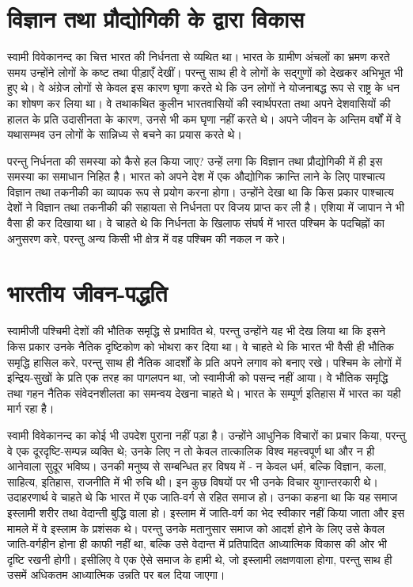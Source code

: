\section*{विज्ञान तथा प्रौद्योगिकी के द्वारा विकास}

स्वामी विवेकानन्द का चित्त भारत की निर्धनता से व्यथित था। भारत के ग्रामीण अंचलों का भ्रमण करते समय उन्होंने लोगों के कष्ट तथा पीड़ाएँ देखीं। परन्तु साथ ही वे लोगों के सद्गुणों को देखकर अभिभूत भी हुए थे। वे अंग्रेज लोगों से केवल इस कारण घृणा करते थे कि उन लोगों ने योजनाबद्ध रूप से राष्ट्र के धन का शोषण कर लिया था। वे तथाकथित कुलीन भारतवासियों की स्वार्थपरता तथा अपने देशवासियों की हालत के प्रति उदासीनता के कारण, उनसे भी कम घृणा नहीं करते थे। अपने जीवन के अन्तिम वर्षों में वे यथासम्भव उन लोगों के सान्निध्य से बचने का प्रयास करते थे। 

परन्तु निर्धनता की समस्या को कैसे हल किया जाए? उन्हें लगा कि विज्ञान तथा प्रौद्योगिकी में ही इस समस्या का समाधान निहित है। भारत को अपने देश में एक औद्योगिक क्रान्ति लाने के लिए पाश्चात्य विज्ञान तथा तकनीकी का व्यापक रूप से प्रयोग करना होगा। उन्होंने देखा था कि किस प्रकार पाश्चात्य देशों ने विज्ञान तथा तकनीकी की सहायता से निर्धनता पर विजय प्राप्त कर ली है। एशिया में जापान ने भी वैसा ही कर दिखाया था। वे चाहते थे कि निर्धनता के खिलाफ संघर्ष में भारत पश्चिम के पदचिह्नों का अनुसरण करे, परन्तु अन्य किसी भी क्षेत्र में वह पश्चिम की नकल न करे।


\section*{भारतीय जीवन-पद्धति}

स्वामीजी पश्चिमी देशों की भौतिक समृद्धि से प्रभावित थे, परन्तु उन्होंने यह भी देख लिया था कि इसने किस प्रकार उनके नैतिक दृष्टिकोण को भोथरा कर दिया था। वे चाहते थे कि भारत भी वैसी ही भौतिक समृद्धि हासिल करे, परन्तु साथ ही नैतिक आदर्शों के प्रति अपने लगाव को बनाए रखे। पश्चिम के लोगों में इन्द्रिय-सुखों के प्रति एक तरह का पागलपन था, जो स्वामीजी को पसन्द नहीं आया। वे भौतिक समृद्धि तथा गहन नैतिक संवेदनशीलता का समन्वय देखना चाहते थे। भारत के सम्पूर्ण इतिहास में भारत का यही मार्ग रहा है। 

स्वामी विवेकानन्द का कोई भी उपदेश पुराना नहीं पड़ा है। उन्होंने आधुनिक विचारों का प्रचार किया, परन्तु वे एक दूरदृष्टि-सम्पन्न व्यक्ति थे; उनके लिए न तो केवल तात्कालिक विश्व महत्त्वपूर्ण था और न ही आनेवाला सुदूर भविष्य। उनकी मनुष्य से सम्बन्धित हर विषय में - न केवल धर्म, बल्कि विज्ञान, कला, साहित्य, इतिहास, राजनीति में भी रुचि थी। इन कुछ विषयों पर भी उनके विचार युगान्तरकारी थे। उदाहरणार्थ वे चाहते थे कि भारत में एक जाति-वर्ग से रहित समाज हो। उनका कहना था कि यह समाज इस्लामी शरीर तथा वेदान्ती बुद्धि वाला हो। इस्लाम में जाति-वर्ग का भेद स्वीकार नहीं किया जाता और इस मामले में वे इस्लाम के प्रशंसक थे। परन्तु उनके मतानुसार समाज को आदर्श होने के लिए उसे केवल जाति-वर्गहीन होना ही काफी नहीं था, बल्कि उसे वेदान्त में प्रतिपादित आध्यात्मिक विकास की ओर भी दृष्टि रखनी होगी। इसीलिए वे एक ऐसे समाज के हामी थे, जो इस्लामी लक्षणवाला होगा, परन्तु साथ ही उसमें अधिकतम आध्यात्मिक उन्नति पर बल दिया जाएगा। 

